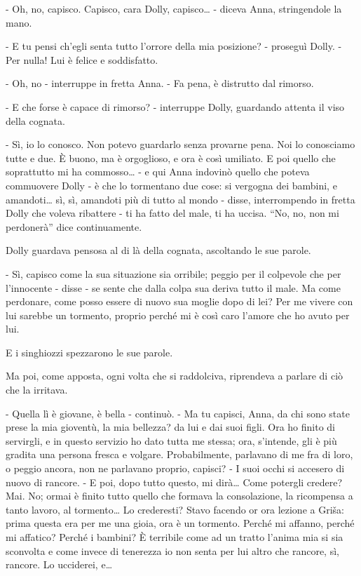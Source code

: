 - Oh, no, capisco. Capisco, cara Dolly, capisco\ldots{} - diceva Anna, stringendole la mano. 

- E tu pensi ch'egli senta tutto l'orrore della mia posizione? - proseguì Dolly. - Per nulla! Lui è felice e soddisfatto. 

- Oh, no - interruppe in fretta Anna. - Fa pena, è distrutto dal rimorso. 

- E che forse è capace di rimorso? - interruppe Dolly, guardando attenta il viso della cognata. 

- Sì, io lo conosco. Non potevo guardarlo senza provarne pena. Noi lo conosciamo tutte e due. È buono, ma è orgoglioso, e ora è così umiliato. E poi quello che soprattutto mi ha commosso\ldots{} - e qui Anna indovinò quello che poteva commuovere Dolly - è che lo tormentano due cose: si vergogna dei bambini, e amandoti\ldots{} sì, sì, amandoti più di tutto al mondo - disse, interrompendo in fretta Dolly che voleva ribattere - ti ha fatto del male, ti ha uccisa. ``No, no, non mi perdonerà'' dice continuamente. 

Dolly guardava pensosa al di là della cognata, ascoltando le sue parole. 

- Sì, capisco come la sua situazione sia orribile; peggio per il colpevole che per l'innocente - disse - se sente che dalla colpa sua deriva tutto il male. Ma come perdonare, come posso essere di nuovo sua moglie dopo di lei? Per me vivere con lui sarebbe un tormento, proprio perché mi è così caro l'amore che ho avuto per lui. 

E i singhiozzi spezzarono le sue parole. 

Ma poi, come apposta, ogni volta che si raddolciva, riprendeva a parlare di ciò che la irritava. 

- Quella lì è giovane, è bella - continuò. - Ma tu capisci, Anna, da chi sono state prese la mia gioventù, la mia bellezza? da lui e dai suoi figli. Ora ho finito di servirgli, e in questo servizio ho dato tutta me stessa; ora, s'intende, gli è più gradita una persona fresca e volgare. Probabilmente, parlavano di me fra di loro, o peggio ancora, non ne parlavano proprio, capisci? - I suoi occhi si accesero di nuovo di rancore. - E poi, dopo tutto questo, mi dirà\ldots{} Come potergli credere? Mai. No; ormai è finito tutto quello che formava la consolazione, la ricompensa a tanto lavoro, al tormento\ldots{} Lo crederesti? Stavo facendo or ora lezione a Griša: prima questa era per me una gioia, ora è un tormento. Perché mi affanno, perché mi affatico? Perché i bambini? È terribile come ad un tratto l'anima mia si sia sconvolta e come invece di tenerezza io non senta per lui altro che rancore, sì, rancore. Lo ucciderei, e\ldots{} 

